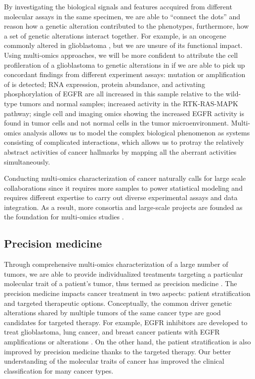 By investigating the biological signals and features accquired from different molecular assays in the same specimen, we are able to ``connect the dots'' and reason how a genetic alteration contributed to the phenotypes, furthermore, how a set of genetic alterations interact together. For example,  is an oncogene commonly altered in glioblastoma \cite{eskilssone_miletich:EGFRHeterogeneity2018}, but we are unsure of its functional impact. Using multi-omics approaches, we will be more confident to attribute the cell profileration of a glioblastoma to genetic alterations in  if we are able to pick up concordant findings from different experiment assays: mutation or amplification of  is detected; RNA expression, protein abundance, and activating phosphorylation of EGFR are all increased in this sample relative to the wild-type tumors and normal samples; increased activity in the RTK-RAS-MAPK pathway; single cell and imaging omics showing the increased EGFR activity is found in tumor cells and not normal cells in the tumor microenvironment. Multi-omics analysis allows us to model the complex biological phenomenon as systems consisting of complicated interactions, which allows us to protray the relatively abstract activities of cancer hallmarks by mapping all the aberrant activities simultaneously.

Conducting multi-omics characterization of cancer naturally calls for large scale collaborations since it requires more samples to power statistical modeling and requires different expertise to carry out diverse experimental assays and data integration. As a result, more consortia and large-scale projects are founded as the foundation for multi-omics studies \cite{hutterc_zenklusenjc:CancerGenome2018,rozenblatt-roseno_zhuangx:HumanTumor2020,rodriguezh_lowydr:NextHorizon2021}.


\subsection{Precision medicine}
Through comprehensive multi-omics characterization of a large number of tumors, we are able to provide individualized treatments targeting a particular molecular trait of a patient's tumor, thus termed as precision medicine \cite{collinsfs_varmush:NewInitiative2015,moscowja_schilskyrl:EvidenceFramework2018,bergermf_mardiser:EmergingClinical2018,rodriguezh_lowydr:NextHorizon2021,chenf_dingl:MovingPancancer2021}.
The precision medicine impacts cancer treatment in two aspects: patient stratification and targeted therapeutic options.
Conceptually, the common driver genetic alterations shared by multiple tumors of the same cancer type are good candidates for targeted therapy.
For example, EGFR inhibitors are developed to treat glioblastoma, lung cancer, and breast cancer patients with EGFR amplifications or alterations \cite{ciardiellof_tortorag:EGFRAntagonists2008}.
On the other hand, the patient stratification is also improved by precision medicine thanks to the targeted therapy.
Our better understanding of the molecular traits of cancer has improved the clinical classification for many cancer types.

